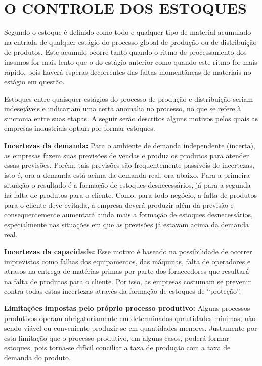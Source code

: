 \chapter{O CONTROLE DOS ESTOQUES}
\label{chap:controle_estoques}

Segundo \cite{slack2006administracao} o estoque é definido como todo e qualquer tipo de material acumulado na entrada de qualquer estágio do processo global de produção ou de distribuição de produtos. Este acumulo ocorre tanto quando o ritmo de processamento dos insumos for mais lento que o do estágio anterior como quando este ritmo for mais rápido, pois haverá esperas decorrentes das faltas momentâneas de materiais no estágio em questão.

Estoques entre quaisquer estágios do processo de produção e distribuição seriam indesejáveis e indicariam uma certa anomalia no processo, no que se refere à sincronia entre suas etapas. A seguir serão descritos alguns motivos pelos quais as empresas industriais optam por formar estoques.

\textbf{Incertezas da demanda:} Para o ambiente de demanda independente (incerta), as empresas fazem suas previsões de vendas e produz os produtos para atender essas previsões. Porém, tais previsões são frequentemente passíveis de incertezas, isto é, ora a demanda está acima da demanda real, ora abaixo. Para a primeira situação o resultado é a formação de estoques desnecessários, já para a segunda há falta de produtos para o cliente. Como, para todo negócio, a falta de produtos para o cliente deve evitada, a empresa deverá produzir além da previsão e consequentemente aumentará ainda mais a formação de estoques desnecessários, especialmente nas situações em que as previsões já estavam acima da demanda real.

\textbf{Incertezas da capacidade:} Esse motivo é baseado na possibilidade de ocorrer imprevistos como falhas dos equipamentos, das máquinas, falta de operadores e atrasos na entrega de matérias primas por parte dos fornecedores que resultará na falta de produtos para o cliente. Por isso, as empresas costumam se prevenir contra todas estas incertezas através da formação de estoques de ``proteção''.

\textbf{Limitações impostas pelo próprio processo produtivo:} Alguns processos produtivos operam obrigatoriamente em determinadas quantidades mínimas, não sendo viável ou conveniente produzir-se em quantidades menores. Justamente por esta limitação que o processo produtivo, em alguns casos, poderá formar estoques, pois torna-se difícil conciliar a taxa de produção com a taxa de demanda do produto.

